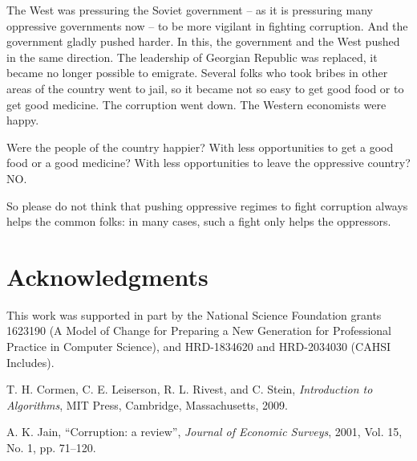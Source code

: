 \documentclass{article}
\begin{document}
The West was pressuring the Soviet government -- as it is
pressuring many oppressive governments now -- to be more vigilant
in fighting corruption. And the government gladly pushed harder.
In this, the government and the West pushed in the same direction.
The leadership of Georgian Republic was replaced, it became no
longer possible to emigrate. Several folks who took bribes in
other areas of the country went to jail, so it became not so easy
to get good food or to get good medicine. The corruption went
down. The Western economists were happy.

Were the people of the country happier? With less
opportunities to get a good food or a good medicine? With less
opportunities to leave the oppressive country? NO.

So please do not think that pushing oppressive regimes to fight
corruption always helps the common folks: in many cases, such a
fight only helps the oppressors.

\section*{Acknowledgments}

This work was supported in part by the National Science Foundation
grants 1623190 (A Model of Change for Preparing a New Generation
for Professional Practice in Computer Science), and HRD-1834620 and
HRD-2034030 (CAHSI Includes).

\begin{thebibliography}{9}

 T. H. Cormen, C. E. Leiserson, R. L. Rivest, and C. Stein, {\it Introduction to Algorithms}, MIT Press,
Cambridge, Massachusetts, 2009.

 A. K. Jain, ``Corruption: a review'', {\it Journal of Economic Surveys}, 2001, Vol. 15, No. 1, pp. 71--120.

\end{thebibliography}
\end{document}
